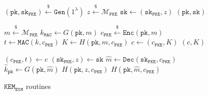 \documentclass[floatrow,journal=tches,submission]{iacrtrans}
\newcommand{\monospace}{\texttt}
\newcommand{\pke}{\monospace{PKE}}
\newcommand{\keygen}{\monospace{Gen}}
\newcommand{\encrypt}{\monospace{Enc}}
\newcommand{\decrypt}{\monospace{Dec}}
\newcommand{\kem}{\monospace{KEM}}
\newcommand{\encap}{\monospace{Encap}}
\newcommand{\decap}{\monospace{Decap}}
\newcommand{\etm}{\monospace{EtM}}  %
\newcommand{\mac}{\monospace{MAC}}
\newcommand{\pk}{\monospace{pk}}
\newcommand{\sk}{\monospace{sk}}
\newcommand{\leftsample}{\stackrel{\$}{\leftarrow}}
\begin{document}
\begin{figure}[H]
    \center
    \begin{minipage}{0.29\textwidth}
        \begin{algorithm}[H]
            \caption{$\keygen_\etm$}\label{alg:etm-keygen}
            \begin{algorithmic}[1]
                \State $(\pk, \sk_\pke) \leftsample \keygen(1^\lambda)$
                \State $z \leftsample \mathcal{M}_\pke$
                \State $\sk \leftarrow (\sk_\pke, z)$
                \State \Return $(\pk, \sk)$
            \end{algorithmic}
        \end{algorithm}
    \end{minipage}
    \hfill
    \begin{minipage}{0.32\textwidth}
        \begin{algorithm}[H]
            \caption{$\encap_\etm(\pk)$}\label{alg:etm-encap}
            \begin{algorithmic}[1]
                \State $m \leftsample \mathcal{M}_\pke$
                \State $k_\mac \leftarrow G(\pk, m)$
                \State $c_\pke \leftsample \encrypt(\pk, m)$
                \State $t \leftarrow \mac(k, c_\pke)$
                \State $K \leftarrow H(\pk, m, c_\pke)$
                \State $c \leftarrow (c_\pke, K)$
                \State \Return $(c, K)$
            \end{algorithmic}
        \end{algorithm}
    \end{minipage}
    \hfill
    \begin{minipage}{0.37\textwidth}
        \begin{algorithm}[H]
            \caption{$\decap_\etm(\sk, c)$}\label{alg:etm-decap}
            \begin{algorithmic}[1]
                \State $(c_\pke, t) \leftarrow c$
                \State $(\sk_\pke, z) \leftarrow \sk$
                \State $\hat{m} \leftarrow \decrypt(\sk_\pke, c_\pke)$
                \State $\hat{k}_\pk \leftarrow G(\pk, \hat{m})$
                \If{$\mac(\hat{k}, c_\pke) \neq t$}
                    \State \Return $H(\pk, z, c_\pke)$
                \EndIf
                \State \Return $H(\pk, \hat{m}, c_\pke)$
            \end{algorithmic}
        \end{algorithm}
    \end{minipage}
    \caption{$\kem_\etm$ routines}\label{fig:etm-routines} 
\end{figure}
\end{document}
